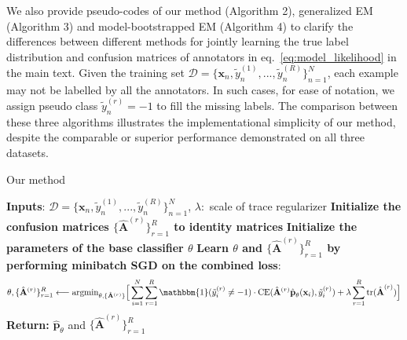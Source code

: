 We also provide pseudo-codes of our method (Algorithm 2), generalized EM \cite{raykar2009supervised} (Algorithm 3) and model-bootstrapped EM \cite{khetan2017learning} (Algorithm 4) to clarify the differences between different methods for jointly learning the true label distribution and confusion matrices of annotators in eq.~\eqref{eq:model_likelihood} in the main text. Given the training set $\mathcal{D} = \{\textbf{x}_n, \tilde{y}^{(1)}_{n},...,\tilde{y}^{(R)}_{n}\}_{n=1}^{N}$, each example may not be labelled by all the annotators. In such cases, for ease of notation, we assign pseudo class $\tilde{y}^{(r)}_{n}=-1$ to fill the missing labels. The comparison between these three algorithms illustrates the implementational simplicity of our method, despite the comparable or superior performance demonstrated on all three datasets. 

\begin{algorithm}
	\caption{Our method}
	\label{alg:ourmethod}
		\footnotesize
	\begin{algorithmic}
		\State \textbf{Inputs}: $\mathcal{D} = \{\textbf{x}_n, \tilde{y}^{(1)}_{n},...,\tilde{y}^{(R)}_{n}\}_{n=1}^{N}$,
		$\lambda:$ scale of trace regularizer
		\State \textbf{Initialize the confusion matrices $\{\hat{\mathbf{A}}^{(r)}\}_{r=1}^{R}$ to identity matrices}
		\State \textbf{Initialize the parameters of the base classifier $\theta$}
		\State \textbf{Learn $\theta$ and $\{\hat{\mathbf{A}}^{(r)}\}_{r=1}^{R}$ by performing minibatch SGD on the combined loss}:
		\vspace{-2mm}
		$$\theta, \{\hat{\mathbf{A}}^{(r)}\}_{r=1}^{R} \longleftarrow \text{argmin}_{\theta, \{\hat{\mathbf{A}}^{(r)}\}} \Big{[}\sum_{i=1}^{N}\sum_{r=1}^{R} \mathbbm{1}(\tilde{y}_{i}^{(r)} \neq -1)\cdot \text{CE}(\hat{\mathbf{A}}^{(r)}\hat{\textbf{p}}_{\theta}(\mathbf{x}_i), \tilde{y}^{(r)}_{i})  + \lambda \sum_{r=1}^{R}\text{tr}(\hat{\textbf{A}}^{(r)}) \Big{]}$$ 
		\vspace{-3mm}
		\State \textbf{Return:   } $\hat{\mathbf{p}}_{\theta}$ and $\{\hat{\mathbf{A}}^{(r)}\}_{r=1}^R$
	\end{algorithmic}
\end{algorithm}

